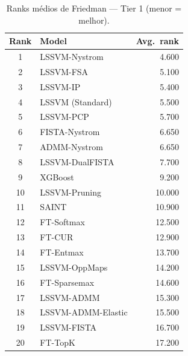\begin{table}[ht]
  \centering
  \caption{Ranks médios de Friedman — Tier 1 (menor = melhor).}
  \label{tab:tier1_ranks}
  \begin{tabular}{clr}
    \toprule
    Rank & Model & Avg.\ rank \\
    \midrule
1 & LSSVM-Nystrom & 4.600 \\
2 & LSSVM-FSA & 5.100 \\
3 & LSSVM-IP & 5.400 \\
4 & LSSVM (Standard) & 5.500 \\
5 & LSSVM-PCP & 5.700 \\
6 & FISTA-Nystrom & 6.650 \\
7 & ADMM-Nystrom & 6.650 \\
8 & LSSVM-DualFISTA & 7.700 \\
9 & XGBoost & 9.200 \\
10 & LSSVM-Pruning & 10.000 \\
11 & SAINT & 10.900 \\
12 & FT-Softmax & 12.500 \\
13 & FT-CUR & 12.900 \\
14 & FT-Entmax & 13.700 \\
15 & LSSVM-OppMaps & 14.200 \\
16 & FT-Sparsemax & 14.600 \\
17 & LSSVM-ADMM & 15.300 \\
18 & LSSVM-ADMM-Elastic & 15.500 \\
19 & LSSVM-FISTA & 16.700 \\
20 & FT-TopK & 17.200 \\
    \bottomrule
  \end{tabular}
\end{table}